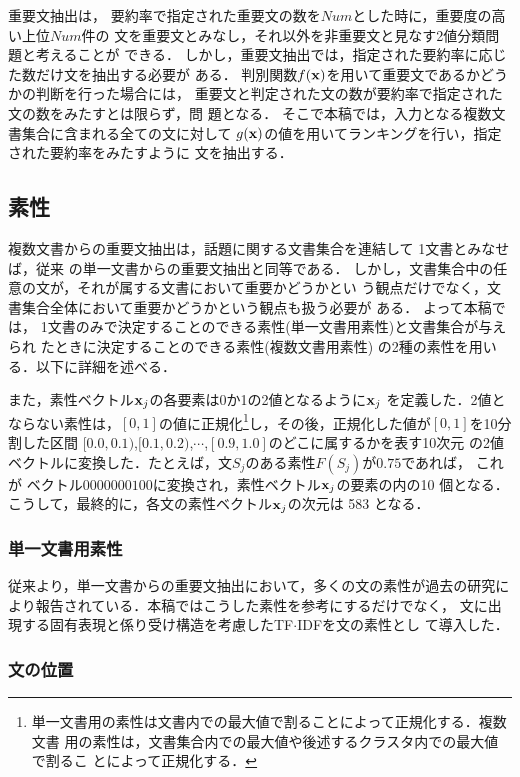 重要文抽出は，
要約率で指定された重要文の数を$Num$とした時に，重要度の高い上位$Num$件の
文を重要文とみなし，それ以外を非重要文と見なす2値分類問題と考えることが
できる．
しかし，重要文抽出では，指定された要約率に応じた数だけ文を抽出する必要が
ある．
判別関数$f({\bf x})$を用いて重要文であるかどうかの判断を行った場合には，
重要文と判定された文の数が要約率で指定された文の数をみたすとは限らず，問
題となる．
そこで本稿では，入力となる複数文書集合に含まれる全ての文に対して
$g({\bf x})$の値を用いてランキングを行い，指定された要約率をみたすように
文を抽出する．

\subsection{素性}

複数文書からの重要文抽出は，話題に関する文書集合を連結して
1文書とみなせば，従来
の単一文書からの重要文抽出と同等である．
しかし，文書集合中の任意の文が，それが属する文書において重要かどうかとい
う観点だけでなく，文書集合全体において重要かどうかという観点も扱う必要が
ある．
よって本稿では，
1文書のみで決定することのできる素性(単一文書用素性)と文書集合が与えられ
たときに決定することのできる素性(複数文書用素性)
の2種の素性を用いる．以下に詳細を述べる．

また，素性ベクトル${\bf x}_j$の各要素は0か1の2値となるように${\bf x}_j$
を定義した．2値とならない素性は，$[0,1]$の値に正規化\footnote{
単一文書用の素性は文書内での最大値で割ることによって正規化する．複数文書
用の素性は，文書集合内での最大値や後述するクラスタ内での最大値で割るこ
とによって正規化する．
}し，その後，正規化した値が$[0,1]$を10分割した区間
$[0.0,0.1)$,$[0.1,0.2)$,$\cdots$,$[0.9,1.0]$のどこに属するかを表す10次元
の2値ベクトルに変換した．たとえば，文$S_j$のある素性$F(S_j)が0.75$であれば，
これが
ベクトル$0000000100$に変換され，素性ベクトル${\bf x}_j$の要素の内の10
個となる．こうして，最終的に，各文の素性ベクトル${\bf x}_j$の次元は 583
となる．

\subsubsection{単一文書用素性}

従来より，単一文書からの重要文抽出において，多くの文の素性が過去の研究に
より報告されている．本稿ではこうした素性を参考にするだけでなく，
文に出現する固有表現と係り受け構造を考慮したTF$\cdot$IDFを文の素性とし
て導入した．


\subsubsection*{文の位置\cite{article2}}

